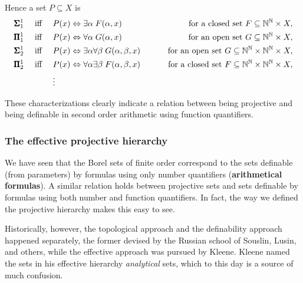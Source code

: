 Hence a set $P\subseteq X$ is
\begin{align*}
\pmb{\Sigma}^{1}_{1}  \quad \text{ iff } \quad & P(x) \Leftrightarrow \exists \alpha \; F(\alpha,x)  \qquad & \text{ for a closed set  } F \subseteq \mathbb{N}^{\mathbb{N}} \times X, \\
\pmb{\Pi}^1_{1} \quad \text{ iff } \quad &  P(x) \Leftrightarrow \forall \alpha \; G(\alpha,x)  \qquad & \text{ for an open set  } G \subseteq \mathbb{N}^{\mathbb{N}} \times X, \\
\pmb{\Sigma}^{1}_{2} \quad \text{ iff } \quad &  P(x) \Leftrightarrow \exists \alpha \forall \beta \; G(\alpha,\beta,x)  \qquad & \text{ for an open set  } G \subseteq \mathbb{N}^{\mathbb{N}} \times \mathbb{N}^{\mathbb{N}} \times X, \\
\pmb{\Pi}^1_{2}  \quad \text{ iff } \quad &  P(x) \Leftrightarrow \forall \alpha \exists \beta \; F(\alpha,\beta, x)  \qquad & \text{ for a closed set  } F \subseteq \mathbb{N}^{\mathbb{N}} \times \mathbb{N}^{\mathbb{N}} \times X, \\
& \vdots
\end{align*}

These characterizations clearly indicate a relation between being projective and being definable in second order arithmetic using function quantifiers.

\subsubsection{The effective projective hierarchy}

We have seen that the Borel sets of finite order correspond to the sets definable (from parameters) by formulas using only number quantifiers (\textbf{arithmetical formulas}). A similar relation holds between projective sets and sets definable by formulas using both number and function quantifiers. In fact, the way we defined the projective hierarchy makes this easy to see.

Historically, however, the topological approach and the definability approach happened separately, the former devised by the Russian school of Souslin, Lusin, and others, while the effective approach was pursued by Kleene. Kleene named the sets in his effective hierarchy \textit{analytical} sets, which to this day is a source of much confusion.

